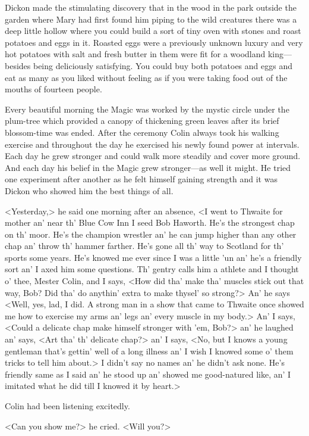 Dickon made the stimulating discovery that in the wood in the park outside the garden where Mary had first found him piping to the wild creatures there was a deep little hollow where you could build a sort of tiny oven with stones and roast potatoes and eggs in it. Roasted eggs were a previously unknown luxury and very hot potatoes with salt and fresh butter in them were fit for a woodland king—besides being deliciously satisfying. You could buy both potatoes and eggs and eat as many as you liked without feeling as if you were taking food out of the mouths of fourteen people.

Every beautiful morning the Magic was worked by the mystic circle under the plum-tree which provided a canopy of thickening green leaves after its brief blossom-time was ended. After the ceremony Colin always took his walking exercise and throughout the day he exercised his newly found power at intervals. Each day he grew stronger and could walk more steadily and cover more ground. And each day his belief in the Magic grew stronger—as well it might. He tried one experiment after another as he felt himself gaining strength and it was Dickon who showed him the best things of all.

<Yesterday,> he said one morning after an absence, <I went to Thwaite for mother an' near th' Blue Cow Inn I seed Bob Haworth. He's the strongest chap on th' moor. He's the champion wrestler an' he can jump higher than any other chap an' throw th' hammer farther. He's gone all th' way to Scotland for th' sports some years. He's knowed me ever since I was a little 'un an' he's a friendly sort an' I axed him some questions. Th' gentry calls him a athlete and I thought o' thee, Mester Colin, and I says, <How did tha' make tha' muscles stick out that way, Bob? Did tha' do anythin' extra to make thysel' so strong?> An' he says <Well, yes, lad, I did. A strong man in a show that came to Thwaite once showed me how to exercise my arms an' legs an' every muscle in my body.> An' I says, <Could a delicate chap make himself stronger with 'em, Bob?> an' he laughed an' says, <Art tha' th' delicate chap?> an' I says, <No, but I knows a young gentleman that's gettin' well of a long illness an' I wish I knowed some o' them tricks to tell him about.> I didn't say no names an' he didn't ask none. He's friendly same as I said an' he stood up an' showed me good-natured like, an' I imitated what he did till I knowed it by heart.>

Colin had been listening excitedly.

<Can you show me?> he cried. <Will you?>

